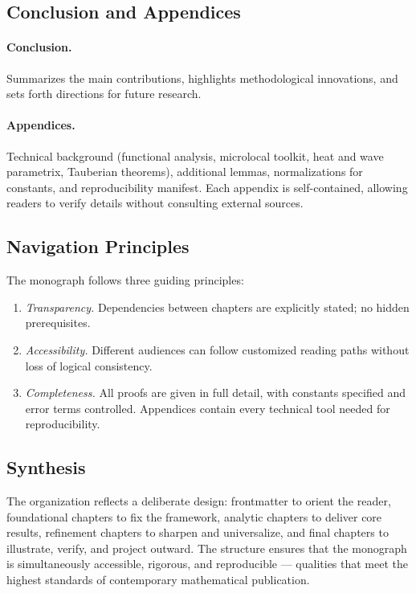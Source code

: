 \subsection*{Conclusion and Appendices}

\paragraph{Conclusion.}
Summarizes the main contributions, highlights methodological
innovations, and sets forth directions for future research.

\paragraph{Appendices.}
Technical background (functional analysis, microlocal toolkit, heat and
wave parametrix, Tauberian theorems), additional lemmas, normalizations
for constants, and reproducibility manifest. Each appendix is
self-contained, allowing readers to verify details without consulting
external sources.

\subsection*{Navigation Principles}

The monograph follows three guiding principles:

\begin{enumerate}
  \item \emph{Transparency.}  
  Dependencies between chapters are explicitly stated; no hidden
  prerequisites.
  \item \emph{Accessibility.}  
  Different audiences can follow customized reading paths without loss of
  logical consistency.
  \item \emph{Completeness.}  
  All proofs are given in full detail, with constants specified and
  error terms controlled. Appendices contain every technical tool needed
  for reproducibility.
\end{enumerate}

\subsection*{Synthesis}

The organization reflects a deliberate design: frontmatter to orient the
reader, foundational chapters to fix the framework, analytic chapters to
deliver core results, refinement chapters to sharpen and universalize,
and final chapters to illustrate, verify, and project outward. The
structure ensures that the monograph is simultaneously accessible,
rigorous, and reproducible — qualities that meet the highest standards
of contemporary mathematical publication.

